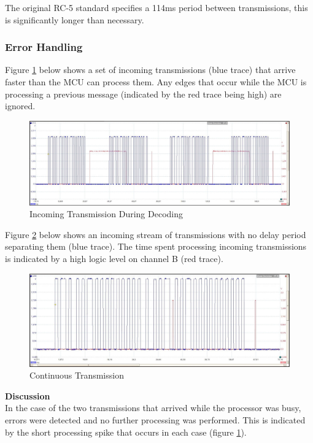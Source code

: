 The original RC-5 standard specifies a 114ms period between transmissions, this is significantly longer than necessary.


\subsubsection{Error Handling}
Figure \ref{fig:transmission_too_fast} below shows a set of incoming transmissions (blue trace) that arrive faster than the MCU can process them. Any edges that occur while the MCU is processing a previous message (indicated by the red trace being high) are ignored.

\begin{figure}[H]
	\centering
	\includegraphics[width=.8\textwidth]{figures/results/receiver_software/transmission_too_fast_crop_crop.JPG}
	\caption{Incoming Transmission During Decoding}
	\label{fig:transmission_too_fast}
\end{figure}

Figure \ref{fig:transmission_too_many_edges} below shows an incoming stream of transmissions with no delay period separating them (blue trace). The time spent processing incoming transmissions is indicated by a high logic level on channel B (red trace).

\begin{figure}[H]
	\centering
	\includegraphics[width=.8\textwidth]{figures/results/receiver_software/transmission_too_many_edges_crop_crop.JPG}
	\caption{Continuous Transmission}
	\label{fig:transmission_too_many_edges}
\end{figure}

\textbf{Discussion}\\
In the case of the two transmissions that arrived while the processor was busy, errors were detected and no further processing was performed. This is indicated by the short processing spike that occurs in each case (figure \ref{fig:transmission_too_fast}).

